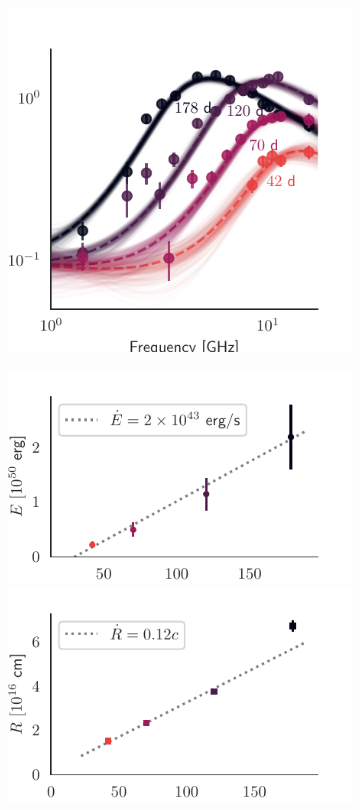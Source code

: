 \documentclass[a4paper,11pt]{article}
\begin{document}
\begin{figure}
	\begin{subfigure}{0.45\textwidth}
		\includegraphics[width=\linewidth]{figures/radio_data}
	\end{subfigure}
	\begin{subfigure}{0.45\textwidth}
		\includegraphics[width=\linewidth]{figures/outflow_energy}
		\includegraphics[width=\linewidth]{figures/outflow_radius}

\end{subfigure}
\end{figure}
\end{document}
